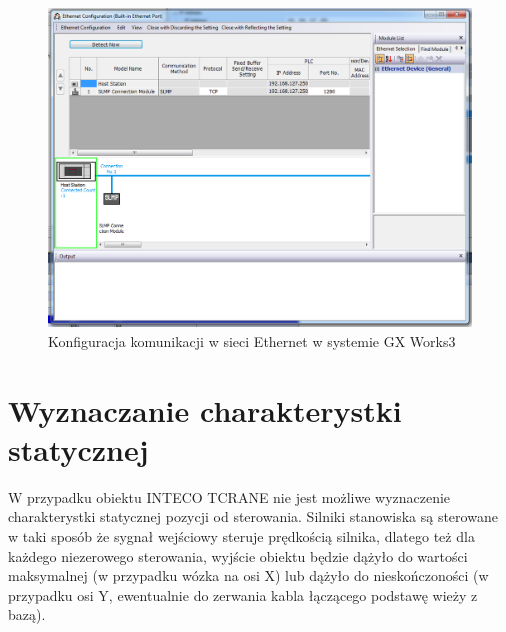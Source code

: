\begin{figure}[H]
    \label{PLC::Konfiguracja::Ethernet::Window}
    \centering
    \includegraphics[scale=0.3]{./sections/inteco/images/ethernet.png}
    \caption{Konfiguracja komunikacji w sieci Ethernet w systemie GX Works3}
\end{figure}

\section{Wyznaczanie charakterystki statycznej}
\label{inteco_char_stat}

W przypadku obiektu INTECO TCRANE nie jest możliwe wyznaczenie charakterystki 
statycznej pozycji od sterowania. Silniki stanowiska są sterowane w taki sposób
że sygnał wejściowy steruje prędkością silnika, dlatego też dla każdego niezerowego
sterowania, wyjście obiektu będzie dążyło do wartości maksymalnej (w przypadku wózka
na osi X) lub dążyło do nieskończoności (w przypadku osi Y, ewentualnie do zerwania 
kabla łączącego podstawę wieży z bazą).